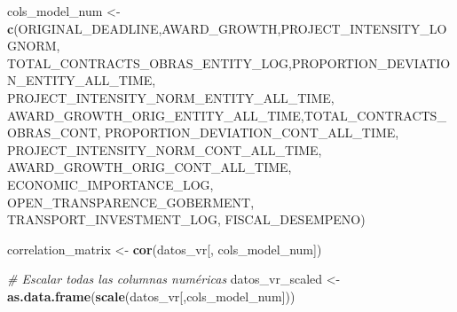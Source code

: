 \documentclass[
]{article}
\newenvironment{Shaded}{\begin{snugshade}}{\end{snugshade}}
\newcommand{\CommentTok}[1]{\textcolor[rgb]{0.56,0.35,0.01}{\textit{#1}}}
\newcommand{\DecValTok}[1]{\textcolor[rgb]{0.00,0.00,0.81}{#1}}
\newcommand{\FunctionTok}[1]{\textcolor[rgb]{0.13,0.29,0.53}{\textbf{#1}}}
\newcommand{\NormalTok}[1]{#1}
\newcommand{\OtherTok}[1]{\textcolor[rgb]{0.56,0.35,0.01}{#1}}
\newcommand{\SpecialCharTok}[1]{\textcolor[rgb]{0.81,0.36,0.00}{\textbf{#1}}}
\newcommand{\StringTok}[1]{\textcolor[rgb]{0.31,0.60,0.02}{#1}}
\begin{document}
\begin{Shaded}
\end{Shaded}

\begin{Shaded}
\begin{Highlighting}[]
\NormalTok{cols\_model\_num }\OtherTok{\textless{}{-}} \FunctionTok{c}\NormalTok{(}\StringTok{\textquotesingle{}ORIGINAL\_DEADLINE\textquotesingle{}}\NormalTok{,}\StringTok{\textquotesingle{}AWARD\_GROWTH\textquotesingle{}}\NormalTok{,}\StringTok{\textquotesingle{}PROJECT\_INTENSITY\_LOGNORM\textquotesingle{}}\NormalTok{,}
          \StringTok{\textquotesingle{}TOTAL\_CONTRACTS\_OBRAS\_ENTITY\_LOG\textquotesingle{}}\NormalTok{,}\StringTok{\textquotesingle{}PROPORTION\_DEVIATION\_ENTITY\_ALL\_TIME\textquotesingle{}}\NormalTok{,}
          \StringTok{\textquotesingle{}PROJECT\_INTENSITY\_NORM\_ENTITY\_ALL\_TIME\textquotesingle{}}\NormalTok{,}
          \StringTok{\textquotesingle{}AWARD\_GROWTH\_ORIG\_ENTITY\_ALL\_TIME\textquotesingle{}}\NormalTok{,}\StringTok{\textquotesingle{}TOTAL\_CONTRACTS\_OBRAS\_CONT\textquotesingle{}}\NormalTok{,}
          \StringTok{\textquotesingle{}PROPORTION\_DEVIATION\_CONT\_ALL\_TIME\textquotesingle{}}\NormalTok{,}
          \StringTok{\textquotesingle{}PROJECT\_INTENSITY\_NORM\_CONT\_ALL\_TIME\textquotesingle{}}\NormalTok{, }\StringTok{\textquotesingle{}AWARD\_GROWTH\_ORIG\_CONT\_ALL\_TIME\textquotesingle{}}\NormalTok{,}
          \StringTok{\textquotesingle{}ECONOMIC\_IMPORTANCE\_LOG\textquotesingle{}}\NormalTok{, }\StringTok{\textquotesingle{}OPEN\_TRANSPARENCE\_GOBERMENT\textquotesingle{}}\NormalTok{,}
          \StringTok{\textquotesingle{}TRANSPORT\_INVESTMENT\_LOG\textquotesingle{}}\NormalTok{,}
          \StringTok{\textquotesingle{}FISCAL\_DESEMPENO\textquotesingle{}}\NormalTok{)}

\NormalTok{correlation\_matrix }\OtherTok{\textless{}{-}} \FunctionTok{cor}\NormalTok{(datos\_vr[, cols\_model\_num])}

\CommentTok{\# Escalar todas las columnas numéricas}
\NormalTok{datos\_vr\_scaled }\OtherTok{\textless{}{-}} \FunctionTok{as.data.frame}\NormalTok{(}\FunctionTok{scale}\NormalTok{(datos\_vr[,cols\_model\_num]))}
\end{Highlighting}
\end{Shaded}
\end{document}
